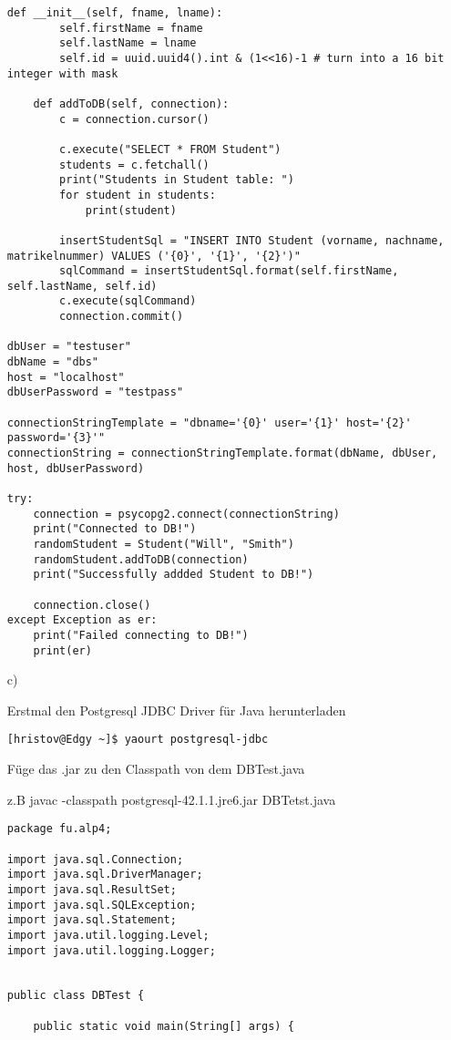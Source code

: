 \begin{itemize}
\begin{lstlisting}[style=py]
	def __init__(self, fname, lname):
		self.firstName = fname
		self.lastName = lname
		self.id = uuid.uuid4().int & (1<<16)-1 # turn into a 16 bit integer with mask

	def addToDB(self, connection):
		c = connection.cursor()

		c.execute("SELECT * FROM Student")
		students = c.fetchall()
		print("Students in Student table: ")
		for student in students:
			print(student)

		insertStudentSql = "INSERT INTO Student (vorname, nachname, matrikelnummer) VALUES ('{0}', '{1}', '{2}')"
		sqlCommand = insertStudentSql.format(self.firstName, self.lastName, self.id)
		c.execute(sqlCommand)
		connection.commit()

dbUser = "testuser"
dbName = "dbs"
host = "localhost"
dbUserPassword = "testpass"

connectionStringTemplate = "dbname='{0}' user='{1}' host='{2}' password='{3}'"
connectionString = connectionStringTemplate.format(dbName, dbUser, host, dbUserPassword)

try:
	connection = psycopg2.connect(connectionString)
	print("Connected to DB!")
	randomStudent = Student("Will", "Smith")
	randomStudent.addToDB(connection)
	print("Successfully addded Student to DB!")
	   
	connection.close()   
except Exception as er:
	print("Failed connecting to DB!")
	print(er)
\end{lstlisting}

\item[c)]

Erstmal den Postgresql JDBC Driver für Java herunterladen

\begin{lstlisting}[style=Bash]
	[hristov@Edgy ~]$ yaourt postgresql-jdbc
\end{lstlisting}

Füge das .jar zu den Classpath von dem DBTest.java

z.B javac -classpath postgresql-42.1.1.jre6.jar DBTetst.java

\begin{lstlisting}[style=java]
package fu.alp4;

import java.sql.Connection;
import java.sql.DriverManager;
import java.sql.ResultSet;
import java.sql.SQLException;
import java.sql.Statement;
import java.util.logging.Level;
import java.util.logging.Logger;


public class DBTest {

    public static void main(String[] args) {


\end{lstlisting}
\end{itemize}
